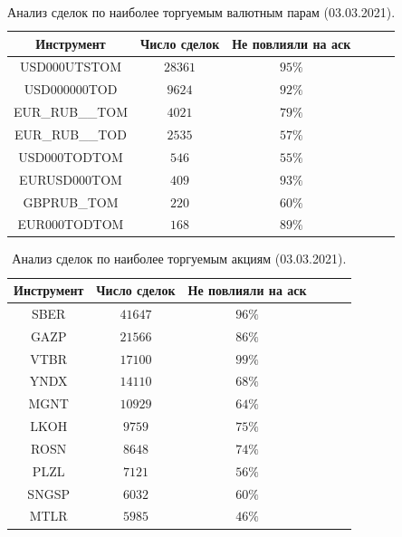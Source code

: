 \begin{table}[h!]
    \begin{center}
        \begin{tabular}{|c|c|c|c|c|c|}
            \hline
        Инструмент        & Число сделок & Не повлияли на аск  %
        \\ \hline
        USD000UTSTOM    & $28361$ &    $95\%$ %
        \\ \hline
        USD000000TOD    & $9624$ &     $92\%$ %
        \\ \hline
        EUR\_RUB\_\_TOM & $4021$ &  $79\%$ %
        \\ \hline
        EUR\_RUB\_\_TOD & $2535$ &  $57\%$ %
        \\ \hline
        USD000TODTOM    & $546$ &      $55\%$ %
        \\ \hline
        EURUSD000TOM    & $409$ &      $93\%$ %
        \\ \hline
        GBPRUB\_TOM     & $220$ &       $60\%$ %
        \\ \hline
        EUR000TODTOM    & $168$ &      $89\%$ %
          \\ \hline
        \end{tabular}
    \end{center}
    \label{tableanalCUnew}
    \caption{Анализ сделок по наиболее торгуемым валютным парам (03.03.2021).}
\end{table} 

\begin{table}[h!]
    \begin{center}
        \begin{tabular}{|c|c|c|c|c|c|}
            \hline
        Инструмент   & Число сделок & Не повлияли на аск %
        \\ \hline
        SBER &  $41647$  & $ 96\% $ %
        \\ \hline
        GAZP &  $21566$  & $ 86\% $ %
        \\ \hline
        VTBR &  $17100$  & $ 99\% $ %
         \\ \hline
        YNDX &  $14110$  & $ 68\% $ %
        \\ \hline
        MGNT &  $10929$  & $ 64\% $ %
        \\ \hline
        LKOH &  $9759 $ &  $ 75\% $ %
        \\ \hline
        ROSN &  $8648 $ &  $ 74\% $ %
         \\ \hline
        PLZL &  $7121 $ &  $ 56\% $ %
        \\ \hline
        SNGSP & $ 6032$  & $ 60\% $ %
        \\ \hline
        MTLR &  $5985 $ &  $ 46\% $ %
        \\ \hline
        \end{tabular}
    \end{center}
    \label{tableanalSE}
    \caption{Анализ сделок по наиболее торгуемым акциям (03.03.2021).}
\end{table} 


